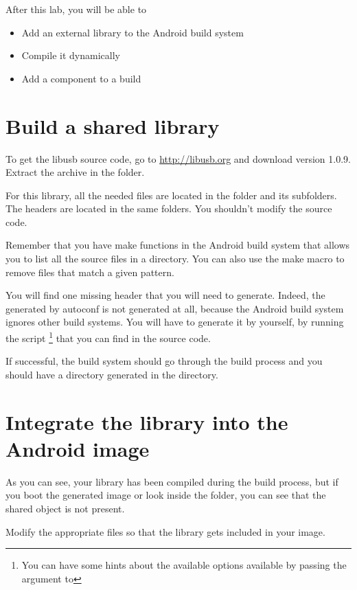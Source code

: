 
After this lab, you will be able to
\begin{itemize}
  \item Add an external library to the Android build system
  \item Compile it dynamically
  \item Add a component to a build
\end{itemize}

\section{Build a shared library}

To get the libusb source code, go to \url{http://libusb.org} and
download version 1.0.9. Extract the archive in the
 folder.

For this library, all the needed  files are located in the
 folder and its subfolders. The headers are located in
the same folders. You shouldn't modify the  source code.

Remember that you have make functions in the Android build system that
allows you to list all the source files in a directory. You can also
use the  make macro to remove files that match a
given pattern.

You will find one missing header that you will need to
generate. Indeed, the  generated by autoconf is not
generated at all, because the Android build system ignores other build
systems. You will have to generate it by yourself, by running the
 script \footnote{You can have some hints about the
  available options available by passing the  argument to
  } that you can find in the  source
code.

If successful, the build system should go through the build process
and you should have a directory generated in the  directory.

\section{Integrate the library into the Android image}

As you can see, your library has been compiled during the build
process, but if you boot the generated image or look inside the
folder, you can see that the shared object is not present.

Modify the appropriate files so that the library gets included in your
image.
